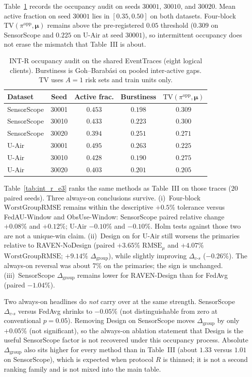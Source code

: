 Table~\ref{tab:int_r_occ} records the occupancy audit on seeds
$30001$, $30010$, and $30020$.  Mean active fraction on seed $30001$
lies in $[0.35,0.50]$ on both datasets.  Four-block
$\mathrm{TV}(\pi^{\mathrm{opp}},\boldsymbol\mu)$ remains above the
pre-registered $0.05$ threshold ($0.309$ on SensorScope and $0.225$ on
U-Air at seed $30001$), so intermittent occupancy does not erase the
mismatch that Table~III is about.

\begin{table}[!htbp]
\centering
\caption{INT-R occupancy audit on the shared EventTraces (eight logical
clients).  Burstiness is Goh--Barab\'asi on pooled inter-active gaps.
$\mathrm{TV}$ uses $A=1$ risk sets and train units only.}
\label{tab:int_r_occ}
\scriptsize
\begin{tabular}{lcccc}
\toprule
Dataset & Seed & Active frac. & Burstiness & $\mathrm{TV}(\pi^{\mathrm{opp}},\boldsymbol\mu)$\\
\midrule
SensorScope & 30001 & $0.453$ & $0.198$ & $0.309$\\
SensorScope & 30010 & $0.433$ & $0.223$ & $0.300$\\
SensorScope & 30020 & $0.394$ & $0.251$ & $0.271$\\
U-Air & 30001 & $0.495$ & $0.263$ & $0.225$\\
U-Air & 30010 & $0.428$ & $0.190$ & $0.275$\\
U-Air & 30020 & $0.403$ & $0.201$ & $0.205$\\
\bottomrule
\end{tabular}
\end{table}

Table~\ref{tab:int_r_e3} ranks the same methods as
Table~III on those traces ($20$ paired seeds).
Three always-on conclusions survive.  (i)~Four-block
$\mathrm{WorstGroupRMSE}$ remains within the descriptive $+0.5\%$
tolerance versus FedAU-Window
and ObsUse-Window: SensorScope paired relative
change $+0.08\%$ and $+0.12\%$; U-Air $-0.10\%$ and $-0.10\%$.  Holm tests
against those two are not a unique-win claim.  (ii)~Design on for U-Air
still worsens the primaries relative to RAVEN-NoDesign
(paired $+3.65\%$ $\mathrm{RMSE}_{\mu}$ and $+4.07\%$
$\mathrm{WorstGroupRMSE}$; $+9.14\%$ $\Delta_{\mathrm{group}}$), while
slightly improving $\Delta_{c\text{-}s}$ ($-0.26\%$).  The always-on
reversal was about $7\%$ on the primaries; the sign is unchanged.
(iii)~SensorScope $\Delta_{\mathrm{group}}$ remains lower for
RAVEN-Design than for FedAvg (paired $-1.04\%$).

Two always-on headlines do \emph{not} carry over at the same strength.
SensorScope $\Delta_{c\text{-}s}$ versus FedAvg shrinks to
$-0.05\%$ (not distinguishable from zero at conventional $p=0.05$).
Removing Design on SensorScope moves
$\Delta_{\mathrm{group}}$ by only $+0.05\%$ (not significant), so the
always-on ablation statement that Design is the useful SensorScope factor is
not recovered under this occupancy process.  Absolute
$\Delta_{\mathrm{group}}$ also sits higher for every method than in
Table~III (about $1.33$ versus $1.01$ on
SensorScope), which is expected when protocol $R$ is thinned; it is not
a second ranking family and is not mixed into the main table.

